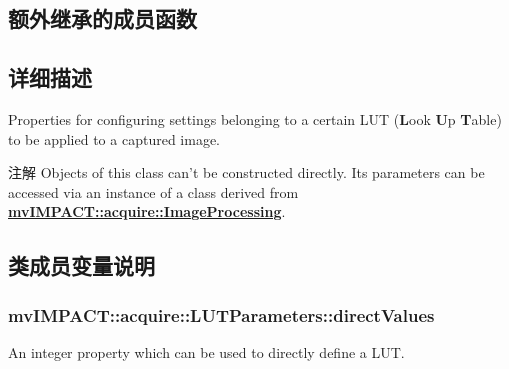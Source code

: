 \subsection*{额外继承的成员函数}


\subsection{详细描述}
Properties for configuring settings belonging to a certain L\+U\+T ({\bfseries L}ook {\bfseries U}p {\bfseries T}able) to be applied to a captured image. 

\begin{DoxyNote}{注解}
Objects of this class can't be constructed directly. Its parameters can be accessed via an instance of a class derived from {\bfseries \hyperlink{classmv_i_m_p_a_c_t_1_1acquire_1_1_image_processing}{mv\+I\+M\+P\+A\+C\+T\+::acquire\+::\+Image\+Processing}}. 
\end{DoxyNote}


\subsection{类成员变量说明}
\hypertarget{classmv_i_m_p_a_c_t_1_1acquire_1_1_l_u_t_parameters_a7e9c15955ba076d23030f6954ca33da1}{
\subsubsection[{direct\+Values}]{ mv\+I\+M\+P\+A\+C\+T\+::acquire\+::\+L\+U\+T\+Parameters\+::direct\+Values}}\label{classmv_i_m_p_a_c_t_1_1acquire_1_1_l_u_t_parameters_a7e9c15955ba076d23030f6954ca33da1}


An integer property which can be used to directly define a L\+U\+T. 

